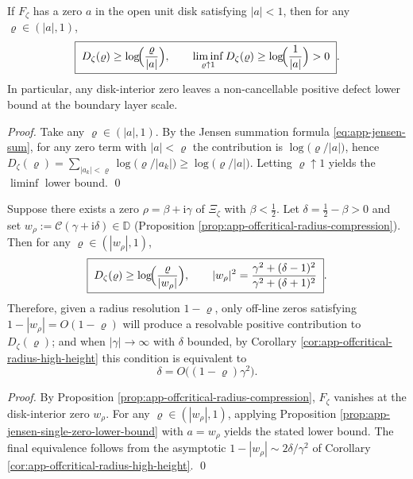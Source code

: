 \begin{proposition}\label{prop:app-jensen-single-zero-lower-bound}
If \(F_{\zeta}\) has a zero \(a\) in the open unit disk satisfying \(|a|<1\), then for any \(\varrho\in(|a|,1)\),
\begin{equation}\label{eq:app-jensen-single-zero-lower-bound}
\boxed{\;
D_{\zeta}(\varrho)\ge \log\!\Bigl(\frac{\varrho}{|a|}\Bigr),
\qquad
\liminf_{\varrho\uparrow 1}D_{\zeta}(\varrho)\ge \log\!\Bigl(\frac{1}{|a|}\Bigr)>0\; }.
\end{equation}
In particular, any disk-interior zero leaves a non-cancellable positive defect lower bound at the boundary layer scale.
\end{proposition}
\begin{proof}
Take any \(\varrho\in(|a|,1)\).
By the Jensen summation formula \eqref{eq:app-jensen-sum}, for any zero term with \(|a|<\varrho\) the contribution is
\(
\log\bigl(\varrho/|a|\bigr)
\), hence
\(
D_{\zeta}(\varrho)=\sum_{|a_k|<\varrho}\log\bigl(\varrho/|a_k|\bigr)\ge \log\bigl(\varrho/|a|\bigr)
\).
Letting \(\varrho\uparrow 1\) yields the \(\liminf\) lower bound. \qed
\end{proof}

\begin{corollary}\label{cor:app-jensen-visible-threshold-offcritical}
Suppose there exists a zero \(\rho=\beta+\mathrm{i}\gamma\) of \(\Xi_{\zeta}\) with \(\beta<\tfrac12\). Let \(\delta=\tfrac12-\beta>0\) and set
\(
w_{\rho}:=\mathcal{C}(\gamma+\mathrm{i}\delta)\in\mathbb{D}
\) (Proposition \ref{prop:app-offcritical-radius-compression}).
Then for any \(\varrho\in(|w_{\rho}|,1)\),
\[
\boxed{\;
D_{\zeta}(\varrho)\ge \log\!\Bigl(\frac{\varrho}{|w_{\rho}|}\Bigr),
\qquad
|w_{\rho}|^{2}=\frac{\gamma^{2}+(\delta-1)^{2}}{\gamma^{2}+(\delta+1)^{2}}\; }.
\]
Therefore, given a radius resolution \(1-\varrho\), only off-line zeros satisfying \(1-|w_{\rho}|=O(1-\varrho)\) will produce a resolvable positive contribution to \(D_{\zeta}(\varrho)\);
and when \(|\gamma|\to\infty\) with \(\delta\) bounded, by Corollary \ref{cor:app-offcritical-radius-high-height} this condition is equivalent to
\[
\delta=O\bigl((1-\varrho)\gamma^{2}\bigr).
\]
\end{corollary}
\begin{proof}
By Proposition \ref{prop:app-offcritical-radius-compression}, \(F_{\zeta}\) vanishes at the disk-interior zero \(w_{\rho}\).
For any \(\varrho\in(|w_{\rho}|,1)\), applying Proposition \ref{prop:app-jensen-single-zero-lower-bound} with \(a=w_{\rho}\) yields the stated lower bound.
The final equivalence follows from the asymptotic \(1-|w_{\rho}|\sim 2\delta/\gamma^{2}\) of Corollary \ref{cor:app-offcritical-radius-high-height}. \qed
\end{proof}

